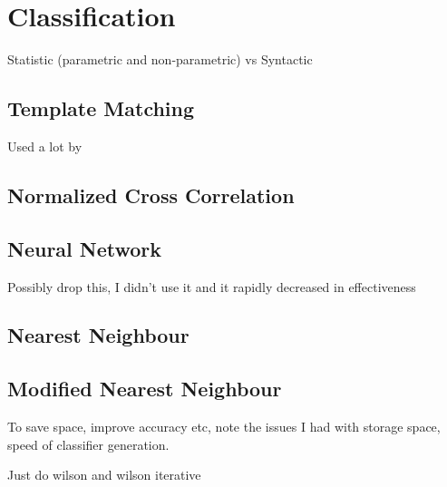 \section{Classification}

Statistic (parametric and non-parametric) vs Syntactic
\subsection{Template Matching}

Used a lot by \parencite{rossant2002global}

\subsection{Normalized Cross Correlation}

\subsection{Neural Network}
Possibly drop this, I didn't use it and it rapidly decreased in effectiveness

\subsection{Nearest Neighbour}

\subsection{Modified Nearest Neighbour}

To save space, improve accuracy etc, note the issues I had with storage space, speed of classifier generation.

Just do wilson and wilson iterative
